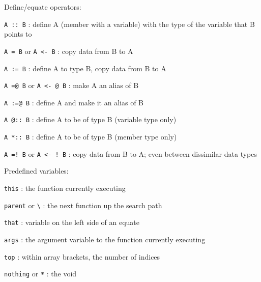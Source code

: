 \documentclass{article}
\begin{document}
\noindent
Define/equate operators:
\begin{description}
\item{\verb#A :: B#} :  define A (member with a variable) with the type of the variable that B points to
\item{\verb#A = B#  or  \verb#A <- B#} :  copy data from B to A
\item{\verb#A := B#} :  define A to type B, copy data from B to A
\item{\verb#A =@ B#  or  \verb#A <- @ B#} :  make A an alias of B
\item{\verb#A :=@ B#} :  define A and make it an alias of B
\item{\verb#A @:: B#} :  define A to be of type B (variable type only)
\item{\verb#A *:: B#} :  define A to be of type B (member type only)
\item{\verb#A =! B#  or  \verb#A <- ! B#} :  copy data from B to A; even between dissimilar data types\\
\end{description}

\noindent
Predefined variables:
\begin{description}
\item{\verb#this#} :  the function currently executing
\item{\verb#parent#  or  \verb#\#} :  the next function up the search path
\item{\verb#that#} :  variable on the left side of an equate
\item{\verb#args#} :  the argument variable to the function currently executing
\item{\verb#top#} :  within array brackets, the number of indices
\item{\verb#nothing#  or  \verb#*#} :  the void\\
\end{description}
\end{document}
